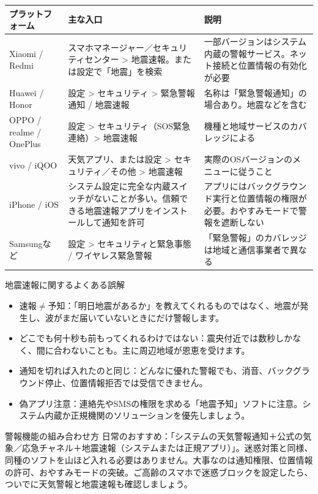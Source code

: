\begin{center}
\begin{tabularx}{\linewidth}{|X|X|X|}
\hline
\textbf{プラットフォーム} & \textbf{主な入口} & \textbf{説明} \tabularnewline
\hline
Xiaomi / Redmi & スマホマネージャー／セキュリティセンター > 地震速報。または設定で「地震」を検索 & 一部バージョンはシステム内蔵の警報サービス。ネット接続と位置情報の有効化が必要 \tabularnewline
Huawei / Honor & 設定 > セキュリティ > 緊急警報通知 / 地震速報 & 名称は「緊急警報通知」の場合あり。地震などを含む \tabularnewline
OPPO / realme / OnePlus & 設定 > セキュリティ（SOS緊急連絡）> 地震速報 & 機種と地域サービスのカバレッジによる \tabularnewline
vivo / iQOO & 天気アプリ、または設定 > セキュリティ／その他 > 地震速報 & 実際のOSバージョンのメニューに従うこと \tabularnewline
iPhone / iOS & システム設定に完全な内蔵スイッチがないことが多い。信頼できる地震速報アプリをインストールして通知を許可 & アプリにはバックグラウンド実行と位置情報の権限が必要。おやすみモードで警報を遮断しない \tabularnewline
Samsungなど & 設定 > セキュリティと緊急事態 / ワイヤレス緊急警報 & 「緊急警報」のカバレッジは地域と通信事業者で異なる \tabularnewline
\hline
\end{tabularx}
\end{center}

\begin{tcbwarn}{地震速報に関するよくある誤解}
\begin{itemize}
  \item 速報$\neq$予知：「明日地震があるか」を教えてくれるものではなく、地震が発生し、波がまだ届いていないときにだけ警報します。
  \item どこでも何十秒も前もってくれるわけではない：震央付近では数秒しかなく、間に合わないことも。主に周辺地域が恩恵を受けます。
  \item 通知を切れば入れたのと同じ：どんなに優れた警報でも、消音、バックグラウンド停止、位置情報拒否では受信できません。
  \item 偽アプリ注意：連絡先やSMSの権限を求める「地震予知」ソフトに注意。システム内蔵か正規機関のソリューションを優先しましょう。
\end{itemize}

\end{tcbwarn}

\begin{tcbinfo}{警報機能の組み合わせ方}
日常のおすすめ：「システムの天気警報通知＋公式の気象／応急チャネル＋地震速報（システムまたは正規アプリ）」。迷惑対策と同様、同種のソフトを山ほど入れる必要はありません。大事なのは通知権限、位置情報の許可、おやすみモードの突破。ご高齢のスマホで迷惑ブロックを設定したら、ついでに天気警報と地震速報も確認しましょう。

\end{tcbinfo}


